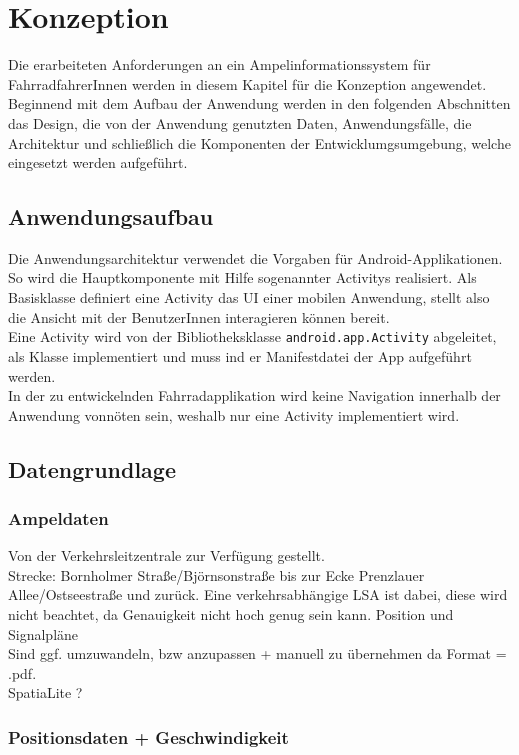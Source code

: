 \chapter{\label{chap:entwurf}Konzeption}
Die erarbeiteten Anforderungen an ein Ampelinformationssystem für FahrradfahrerInnen werden in diesem Kapitel für die Konzeption angewendet. Beginnend mit dem Aufbau der Anwendung werden in den folgenden Abschnitten das Design, die von der Anwendung genutzten Daten, Anwendungsfälle, die Architektur und schließlich die Komponenten der Entwicklumgsumgebung, welche eingesetzt werden aufgeführt. 
\section{Anwendungsaufbau}
Die Anwendungsarchitektur verwendet die Vorgaben für Android-Applikationen. So wird die Hauptkomponente mit Hilfe sogenannter \glspl{Activity} realisiert. Als Basisklasse definiert eine \gls{Activity} das \gls{UI} einer mobilen Anwendung, stellt also die Ansicht mit der BenutzerInnen interagieren können bereit.\\
Eine \gls{Activity} wird von der Bibliotheksklasse \texttt{android.app.Activity} abgeleitet, als Klasse implementiert und muss ind er Manifestdatei der \gls{App} aufgeführt werden. \cite{android_activity} \\
In der zu entwickelnden Fahrradapplikation wird keine Navigation innerhalb der Anwendung vonnöten sein, weshalb nur eine \gls{Activity} implementiert wird.
\section{Datengrundlage}
\subsection{Ampeldaten}
Von der Verkehrsleitzentrale zur Verfügung gestellt.\\
Strecke: Bornholmer Straße/Björnsonstraße bis zur Ecke Prenzlauer Allee/Ostseestraße und zurück. 
Eine verkehrsabhängige \gls{LSA} ist dabei, diese wird nicht beachtet, da Genauigkeit nicht hoch genug sein kann.
Position und Signalpläne\\
Sind ggf. umzuwandeln, bzw anzupassen + manuell zu übernehmen da Format = .pdf.\\
SpatiaLite ?
\subsection{Positionsdaten + Geschwindigkeit}

